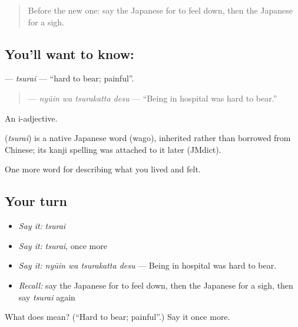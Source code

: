 \label{lesson:JA-C429-tsurai}



\begin{quote}
Before the new one: say the Japanese for to feel down, then the Japanese for a sigh.
\end{quote}

\subsection*{You'll want to know: }
\textbf{} — \emph{tsurai} — \textquotedblleft{}hard to bear; painful\textquotedblright{}.

\begin{quote}
\textbf{ } — \emph{nyūin wa tsurakatta desu} — \textquotedblleft{}Being in hospital was hard to bear.\textquotedblright{}
\end{quote}

An i-adjective.

\begin{cousinweb}
\textbf{} (\emph{tsurai}) is a native Japanese word (wago), inherited rather than borrowed from Chinese; its kanji spelling was attached to it later (JMdict).
\end{cousinweb}

\begin{grammarlens}[title={What you've built}]
One more word for describing what you lived and felt.
\end{grammarlens}

\subsection*{Your turn}
\begin{itemize}
\raggedright
  \item \emph{Say it:} \emph{tsurai}
  \item \emph{Say it:} \emph{tsurai}, once more
  \item \emph{Say it:} \emph{nyūin wa tsurakatta desu} — Being in hospital was hard to bear.
  \item \emph{Recall:} say the Japanese for to feel down, then the Japanese for a sigh, then say \emph{tsurai} again
\end{itemize}

\begin{tcolorbox}[breakable,colback=teal!4,colframe=teal!35!black,title={Before you move on}]
What does  mean? (\textquotedblleft{}Hard to bear; painful\textquotedblright{}.) Say it once more.
\end{tcolorbox}

